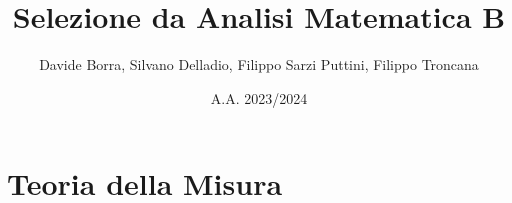 \documentclass{book}
\title{Selezione da Analisi Matematica B}
\author{Davide Borra, Silvano Delladio, Filippo Sarzi Puttini, Filippo Troncana}
\date{A.A. 2023/2024}
\begin{document}
\maketitle
\tableofcontents

\chapter{Teoria della Misura}


\end{document}
